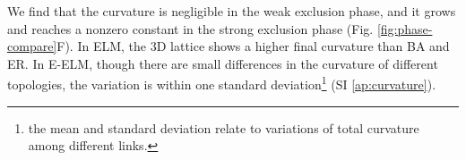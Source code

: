 \documentclass[nofootinbib,preprint,floatfix,titlepage,endfloats]{revtex4} %
\begin{document}
We find that  the curvature is negligible in the weak exclusion phase, and it grows and reaches a nonzero constant in the strong exclusion phase (Fig. \ref{fig:phase-compare}F). In ELM, the 3D lattice shows a higher final curvature than BA and ER. 
In E-ELM, though there are small differences in the curvature of different topologies, the variation is within one standard deviation\footnote{the mean and standard deviation relate to variations of total curvature among different links. } (SI \ref{ap:curvature}).  
\end{document}
